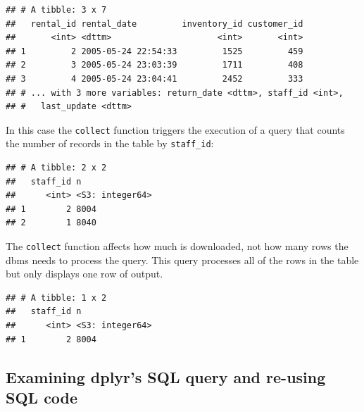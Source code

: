 \documentclass[]{book}
\newenvironment{Shaded}{\begin{snugshade}}{\end{snugshade}}
\newcommand{\DataTypeTok}[1]{\textcolor[rgb]{0.13,0.29,0.53}{#1}}
\newcommand{\DecValTok}[1]{\textcolor[rgb]{0.00,0.00,0.81}{#1}}
\newcommand{\KeywordTok}[1]{\textcolor[rgb]{0.13,0.29,0.53}{\textbf{#1}}}
\newcommand{\NormalTok}[1]{#1}
\newcommand{\OperatorTok}[1]{\textcolor[rgb]{0.81,0.36,0.00}{\textbf{#1}}}
\newcommand{\StringTok}[1]{\textcolor[rgb]{0.31,0.60,0.02}{#1}}
\theoremstyle{definition}
\theoremstyle{definition}
\theoremstyle{definition}
\theoremstyle{remark}
\begin{document}
\begin{verbatim}
## # A tibble: 3 x 7
##   rental_id rental_date         inventory_id customer_id
##       <int> <dttm>                     <int>       <int>
## 1         2 2005-05-24 22:54:33         1525         459
## 2         3 2005-05-24 23:03:39         1711         408
## 3         4 2005-05-24 23:04:41         2452         333
## # ... with 3 more variables: return_date <dttm>, staff_id <int>,
## #   last_update <dttm>
\end{verbatim}

In this case the \texttt{collect} function triggers the execution of a
query that counts the number of records in the table by
\texttt{staff\_id}:

\begin{Shaded}
\end{Shaded}

\begin{verbatim}
## # A tibble: 2 x 2
##   staff_id n              
##      <int> <S3: integer64>
## 1        2 8004           
## 2        1 8040
\end{verbatim}

The \texttt{collect} function affects how much is downloaded, not how
many rows the dbms needs to process the query. This query processes all
of the rows in the table but only displays one row of output.

\begin{Shaded}
\end{Shaded}

\begin{verbatim}
## # A tibble: 1 x 2
##   staff_id n              
##      <int> <S3: integer64>
## 1        2 8004
\end{verbatim}

\hypertarget{examining-dplyrs-sql-query-and-re-using-sql-code}{%
\subsection{Examining dplyr's SQL query and re-using SQL
code}\label{examining-dplyrs-sql-query-and-re-using-sql-code}}
\end{document}
